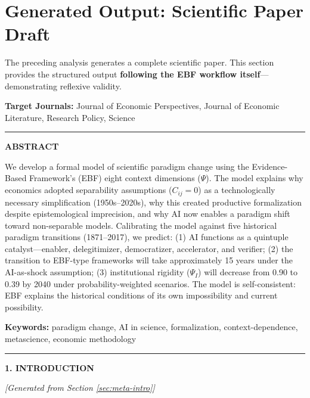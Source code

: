 \section{Generated Output: Scientific Paper Draft}
\label{sec:meta-paper-draft}

The preceding analysis generates a complete scientific paper. This section
provides the structured output \textbf{following the EBF workflow itself}---demonstrating
reflexive validity.

\begin{tcolorbox}[colback=blue!3!white, colframe=blue!75!black,
    title=\textbf{PAPER: The AI-Driven Transformation of Economic Science: A Formal Model}]

\textbf{Target Journals:} Journal of Economic Perspectives, Journal of Economic Literature,
Research Policy, Science

\vspace{0.5em}
\hrule
\vspace{0.5em}

\textbf{ABSTRACT}

We develop a formal model of scientific paradigm change using the Evidence-Based Framework's
(EBF) eight context dimensions ($\Psi$). The model explains why economics adopted separability
assumptions ($C_{ij} = 0$) as a technologically necessary simplification (1950s--2020s),
why this created productive formalization despite epistemological imprecision, and why
AI now enables a paradigm shift toward non-separable models. Calibrating the model against
five historical paradigm transitions (1871--2017), we predict: (1) AI functions as a
quintuple catalyst---enabler, delegitimizer, democratizer, accelerator, and verifier;
(2) the transition to EBF-type frameworks will take approximately 15 years under
the AI-as-shock assumption; (3) institutional rigidity ($\Psi_I$) will decrease from 0.90
to 0.39 by 2040 under probability-weighted scenarios. The model is self-consistent:
EBF explains the historical conditions of its own impossibility and current possibility.

\vspace{0.5em}
\textbf{Keywords:} paradigm change, AI in science, formalization, context-dependence,
metascience, economic methodology

\vspace{0.5em}
\hrule
\vspace{0.5em}

\textbf{1. INTRODUCTION}

\textit{[Generated from Section \ref{sec:meta-intro}]}


\end{tcolorbox}
